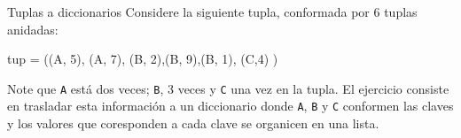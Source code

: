 \documentclass[
  ignorenonframetext,
  aspectratio=169,
  spanish,
]{beamer}
\newenvironment{Shaded}{\begin{snugshade}}{\end{snugshade}}
\newcommand{\DecValTok}[1]{\textcolor[rgb]{0.68,0.00,0.00}{#1}}
\newcommand{\NormalTok}[1]{\textcolor[rgb]{0.00,0.23,0.31}{#1}}
\newcommand{\OperatorTok}[1]{\textcolor[rgb]{0.37,0.37,0.37}{#1}}
\newcommand{\StringTok}[1]{\textcolor[rgb]{0.13,0.47,0.30}{#1}}
\begin{document}
\begin{frame}[fragile]{Tuplas a diccionarios}
\label{tuplas-a-diccionarios}
Considere la siguiente tupla, conformada por 6 tuplas anidadas:

\begin{Shaded}
\begin{Highlighting}[]
\NormalTok{tup }\OperatorTok{=}\NormalTok{ ((}\StringTok{\textquotesingle{}A\textquotesingle{}}\NormalTok{, }\DecValTok{5}\NormalTok{), (}\StringTok{\textquotesingle{}A\textquotesingle{}}\NormalTok{, }\DecValTok{7}\NormalTok{),}
\NormalTok{       (}\StringTok{\textquotesingle{}B\textquotesingle{}}\NormalTok{, }\DecValTok{2}\NormalTok{),(}\StringTok{\textquotesingle{}B\textquotesingle{}}\NormalTok{, }\DecValTok{9}\NormalTok{),(}\StringTok{\textquotesingle{}B\textquotesingle{}}\NormalTok{, }\DecValTok{1}\NormalTok{),}
\NormalTok{       (}\StringTok{\textquotesingle{}C\textquotesingle{}}\NormalTok{,}\DecValTok{4}\NormalTok{) )}
\end{Highlighting}
\end{Shaded}

Note que \texttt{\textquotesingle{}A\textquotesingle{}} está dos veces;
\texttt{\textquotesingle{}B\textquotesingle{}}, 3 veces y
\texttt{\textquotesingle{}C\textquotesingle{}} una vez en la tupla. El
ejercicio consiste en trasladar esta información a un diccionario donde
\texttt{\textquotesingle{}A\textquotesingle{}},
\texttt{\textquotesingle{}B\textquotesingle{}} y
\texttt{\textquotesingle{}C\textquotesingle{}} conformen las claves y
los valores que coresponden a cada clave se organicen en una lista.
\end{frame}
\end{document}
